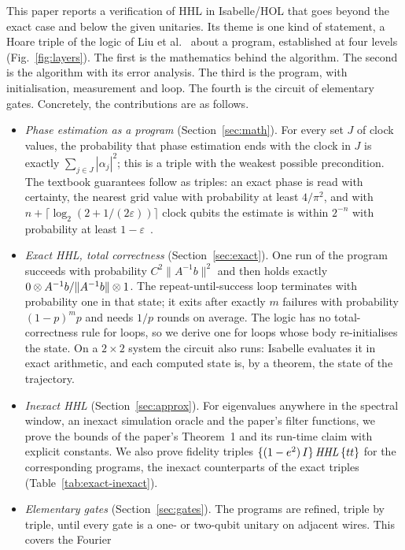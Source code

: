 \documentclass[runningheads]{llncs}
\let\ket\relax\let\bra\relax\let\braket\relax\let\ketbra\relax
\newcommand{\ket}[1]{|#1\rangle}
\newcommand{\bra}[1]{\langle #1|}
\newcommand{\braket}[2]{\langle #1|#2\rangle}
\newcommand{\ketbra}[2]{|#1\rangle\langle #2|}
\newcommand{\norm}[1]{\|#1\|}
\begin{document}
This paper reports a verification of HHL in Isabelle/HOL that goes beyond the exact case and below
the given unitaries. Its theme is one kind of statement, a Hoare triple of the logic of Liu et
al.~\cite{liu2019qhl,liu2019afp} about a program, established at four levels (Fig.~\ref{fig:layers}).
The first is the mathematics behind the algorithm. The second is the algorithm with its error
analysis. The third is the program, with initialisation, measurement and loop. The fourth is the
circuit of elementary gates. Concretely, the contributions are as follows.
\begin{itemize}
\item \emph{Phase estimation as a program} (Section~\ref{sec:math}). For every set $J$ of clock
values, the probability that phase estimation ends with the clock in $J$ is exactly
$\sum_{j\in J}|\alpha_j|^2$; this is a triple with the weakest possible precondition. The textbook
guarantees follow as triples: an exact phase is read with certainty, the nearest grid value with
probability at least $4/\pi^2$, and with $n+\lceil\log_2(2+1/(2\varepsilon))\rceil$ clock qubits the
estimate is within $2^{-n}$ with probability at least $1-\varepsilon$~\cite{nielsenchuang}.
\item \emph{Exact HHL, total correctness} (Section~\ref{sec:exact}). One run of the program
succeeds with probability $C^2\norm{A^{-1}b}^2$ and then holds exactly
$\ket0\otimes A^{-1}b/\norm{A^{-1}b}\otimes\ket1$. The repeat-until-success loop terminates with
probability one in that state; it exits after exactly $m$ failures with probability $(1-p)^mp$ and
needs $1/p$ rounds on average. The logic has no total-correctness rule for loops, so we derive one
for loops whose body re-initialises the state. On a $2\times2$ system the circuit also runs:
Isabelle evaluates it in exact arithmetic, and each computed state is, by a theorem, the state of
the trajectory.
\item \emph{Inexact HHL} (Section~\ref{sec:approx}). For eigenvalues anywhere in the spectral
window, an inexact simulation oracle and the paper's filter functions, we prove the bounds of the
paper's Theorem~1 and its run-time claim with explicit constants. We also prove fidelity triples
$\{(1-e^2)\,I\}\,\mathit{HHL}\,\{\ketbra tt\}$ for the corresponding programs, the inexact
counterparts of the exact triples (Table~\ref{tab:exact-inexact}).
\item \emph{Elementary gates} (Section~\ref{sec:gates}). The programs are refined, triple by triple,
until every gate is a one- or two-qubit unitary on adjacent wires. This covers the Fourier

\end{itemize}
\end{document}
